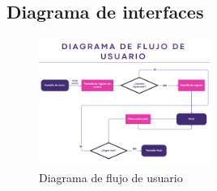 \subsection{Diagrama de interfaces}

\begin{figure}[H]
    \centering
   \includegraphics[width=0.5\textwidth]{recursos/Imagenes/Diagrama de Flujo de usuario (1).png} 
    \caption{Diagrama de flujo de usuario}
    \label{fig:mi_imagen}
\end{figure}

